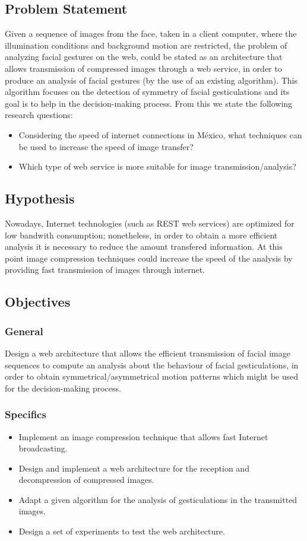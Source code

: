 \documentclass[12pt,letterpaper,titlepage]{article}
\begin{document}
\subsection{Problem Statement}
Given a sequence of images from the face, taken in a client computer, where the illumination conditions and background motion are restricted, the problem of analyzing facial gestures on the web, could be stated as an architecture that allows transmission of compressed images through a web service, in order to produce an analysis of facial gestures (by the use of an existing algorithm). This algorithm focuses on the detection of symmetry of facial gesticulations and its goal is to help in the decision-making process. From this we state the following research questions:
\begin{itemize}
\item Considering the speed of internet connections in M\'exico, what techniques can be used to increase the speed of image transfer?
\item Which type of web service is more suitable for image transmission/analysis?
\end{itemize}

\subsection{Hypothesis}
Nowadays, Internet technologies (such as REST web services) are optimized for low bandwith consumption; nonetheless, in order to obtain a more efficient analysis it is necessary to reduce the amount transfered information. At this point image compression techniques could increase the speed of the analysis by providing fast transmission of images through internet.

\subsection{Objectives}
\subsubsection{General}
Design a web architecture that allows the efficient transmission of facial image sequences to compute an analysis about the behaviour of facial gesticulations, in order to obtain symmetrical/asymmetrical motion patterns which might be used for the decision-making process.
\subsubsection{Specifics}
\begin{itemize}
\item Implement an image compression technique that allows fast Internet broadcasting.
\item Design and implement a web architecture for the reception and decompression of compressed images.
\item Adapt a given algorithm for the analysis of gesticulations in the transmitted images.
\item Design a set of experiments to test the web architecture.
\end{itemize}
\end{document}
